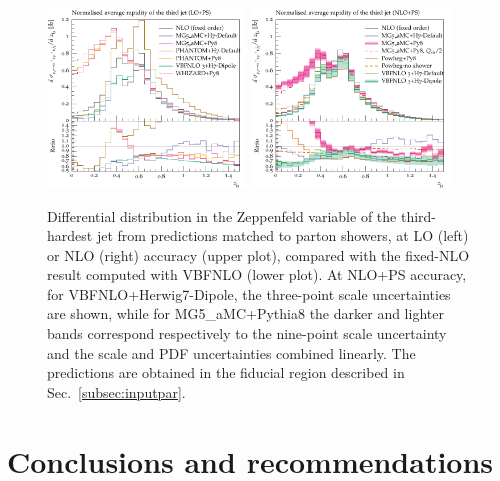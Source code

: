\documentclass[twocolumn,epjc3]{svjour3} %
\newlength{\width}
\begin{document}
\begin{figure}[hbt]
\centering
\includegraphics[width=0.47\textwidth]{figures/LOPS/z_j3.pdf}
\includegraphics[width=0.47\textwidth]{figures/NLOPS/z_j3.pdf}
\caption{Differential distribution in the
Zeppenfeld variable of the third-hardest jet
from predictions matched to parton showers, at LO (left) or NLO (right) accuracy (upper plot), compared with the fixed-NLO result computed with {\sc VBFNLO} (lower plot). At NLO+PS accuracy, for
    {\sc VBFNLO}+{\sc Herwig7-Dipole}, the three-point scale uncertainties are shown, while for {\sc MG5\_aMC}+{\sc Pythia8} the darker and lighter bands correspond
    respectively to the nine-point scale uncertainty and the scale and PDF uncertainties combined linearly.
    The predictions are obtained in the fiducial region described in Sec.~\protect\ref{subsec:inputpar}.}
\label{fig:PSz3}
\end{figure}


\section{Conclusions and recommendations}
\label{sec:conclusion}
\end{document}
